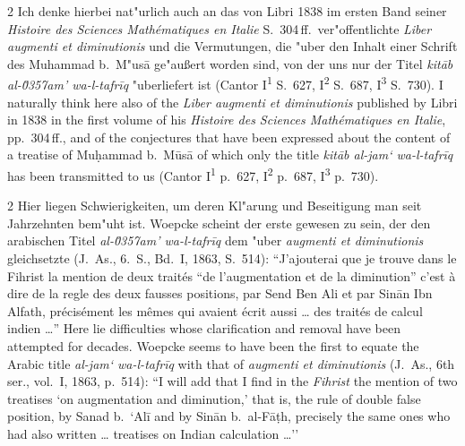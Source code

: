 \documentclass[10pt,a4paper]{article}
\renewcommand{\switchcolumn}{\syncronize\nointerlineskip\columnbreak}
\newcommand{\enquote}[1]{``#1''}
\begin{document}
\begin{paracol}{2}
Ich denke hierbei nat"urlich auch an das von Libri 1838 im ersten Band seiner \textit{Histoire des Sciences Math\'ematiques en Italie} S.\ 304\,ff.\ ver"offentlichte \textit{Liber augmenti et diminutionis} und die Vermutungen, die "uber den Inhalt einer Schrift des Muhammad b.\ M"us\=a ge"au\ss{}ert worden sind, von der uns nur der Titel \textit{kit\=ab al-\u0357{}am' wa-l-tafr\={i}q} "uberliefert ist (Cantor I\textsuperscript{1} S.\ 627, I\textsuperscript{2} S.\ 687, I\textsuperscript{3} S.\ 730).
\switchcolumn
I naturally think here also of the \textit{Liber augmenti et diminutionis} published by Libri in 1838 in the first volume of his \textit{Histoire des Sciences Math\'ematiques en Italie}, pp.\ 304\,ff., and of the conjectures that have been expressed about the content of a treatise of Mu\d{h}ammad b.\ M\=us\=a of which only the title \textit{kit\=ab al-jam` wa-l-tafr\={i}q} has been transmitted to us (Cantor I\textsuperscript{1} p.\ 627, I\textsuperscript{2} p.\ 687, I\textsuperscript{3} p.\ 730).
\end{paracol}

\begin{paracol}{2}
Hier liegen Schwierigkeiten, um deren Kl"arung und Beseitigung man seit Jahrzehnten bem"uht ist. Woepcke scheint der erste gewesen zu sein, der den arabischen Titel \textit{al-\u0357{}am' wa-l-tafr\={i}q} dem "uber \textit{augmenti et diminutionis} gleichsetzte (J.\ As., 6.\ S., Bd.\ I, 1863, S.\ 514): \enquote{J'ajouterai que je trouve dans le Fihrist la mention de deux trait\'es \enquote{de l'augmentation et de la diminution} c'est \`a dire de la regle des deux fausses positions, par Send Ben Ali et par Sin\=an Ibn Alfath, pr\'ecis\'ement les m\^emes qui avaient \'ecrit aussi \ldots{} des trait\'es de calcul indien \ldots{}}
\switchcolumn
Here lie difficulties whose clarification and removal have been attempted for decades. Woepcke seems to have been the first to equate the Arabic title \textit{al-jam` wa-l-tafr\={i}q} with that of \textit{augmenti et diminutionis} (J.\ As., 6th ser., vol.\ I, 1863, p.\ 514): ``I will add that I find in the \textit{Fihrist} the mention of two treatises `on augmentation and diminution,' that is, the rule of double false position, by Sanad b.\ `Al\={i} and by Sin\=an b.\ al-F\=a\d{t}h, precisely the same ones who had also written \ldots{} treatises on Indian calculation \ldots{}''
\end{paracol}
\end{document}
